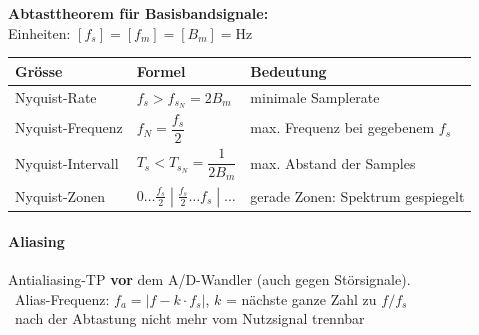 \begin{minipage}{.3\linewidth}
	\textbf{Abtasttheorem für Basisbandsignale:} \\[.3em]
	{\small Einheiten: $[f_s] = [f_m] = [B_m] = \si{\hertz}$}
\end{minipage}
\begin{minipage}{.7\linewidth}
	{\renewcommand{\arraystretch}{1.6}
	\begin{tabularx}{\linewidth}{l l X}
		\textbf{Grösse} & \textbf{Formel} & \textbf{Bedeutung} \\ \hline
		Nyquist-Rate      & $f_s > f_{s_N} = 2 B_m$ & minimale Samplerate \\
		Nyquist-Frequenz  & $f_N = \dfrac{f_s}{2}$ & max. Frequenz bei gegebenem $f_s$ \\
		Nyquist-Intervall & $T_s < T_{s_N} = \dfrac{1}{2 B_m}$ & max. Abstand der Samples \\
		Nyquist-Zonen     & $0\ldots\tfrac{f_s}{2} \;|\; \tfrac{f_s}{2}\ldots f_s \;|\; \ldots$ & gerade Zonen: Spektrum gespiegelt \\
	\end{tabularx}}
\end{minipage}

\paragraph{Aliasing}
Antialiasing-TP \textbf{vor} dem A/D-Wandler (auch gegen Störsignale).\\
{\small \textrightarrow\ Alias-Frequenz: $f_a = |f - k \cdot f_s|$, $k$ = nächste ganze Zahl zu $f/f_s$}\\
{\small \textrightarrow\ nach der Abtastung nicht mehr vom Nutzsignal trennbar}

